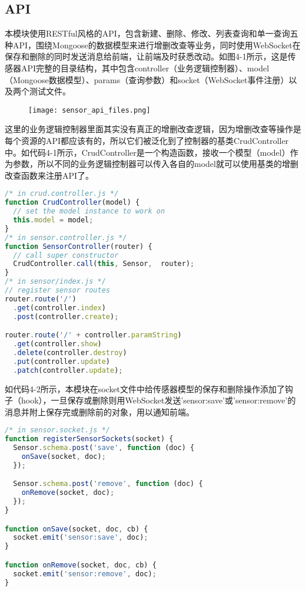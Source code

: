 \subsection{API}
本模块使用RESTful风格的API，包含新建、删除、修改、列表查询和单一查询五种API，围绕Mongoose的数据模型来进行增删改查等业务，同时使用WebSocket在保存和删除的同时发送消息给前端，让前端及时获悉改动。如图4-1所示，这是传感器API完整的目录结构，其中包含controller（业务逻辑控制器）、model（Mongoose数据模型）、params（查询参数）和socket（WebSocket事件注册）以及两个测试文件。
\begin{figure}[H]
 \centering
 \texttt{[image: sensor\_api\_files.png]}
\end{figure}
这里的业务逻辑控制器里面其实没有真正的增删改查逻辑，因为增删改查等操作是每个资源的API都应该有的，所以它们被泛化到了控制器的基类CrudController中。如代码4-1所示，CrudController是一个构造函数，接收一个模型（model）作为参数，所以不同的业务逻辑控制器可以传入各自的model就可以使用基类的增删改查函数来注册API了。
\begin{lstlisting}[language={JavaScript}, caption={传感器API定义}]
/* in crud.controller.js */
function CrudController(model) {
  // set the model instance to work on
  this.model = model;
}
/* in sensor.controller.js */
function SensorController(router) {
  // call super constructor
  CrudController.call(this, Sensor,  router);
}
/* in sensor/index.js */
// register sensor routes
router.route('/')
  .get(controller.index)
  .post(controller.create);

router.route('/' + controller.paramString)
  .get(controller.show)
  .delete(controller.destroy)
  .put(controller.update)
  .patch(controller.update);
\end{lstlisting}

如代码4-2所示，本模块在socket文件中给传感器模型的保存和删除操作添加了钩子（hook），一旦保存或删除则用WebSocket发送'sensor:save'或'sensor:remove'的消息并附上保存完或删除前的对象，用以通知前端。
\begin{lstlisting}[language={JavaScript}, caption={Sensor的Mongoose模型}]
/* in sensor.socket.js */
function registerSensorSockets(socket) {
  Sensor.schema.post('save', function (doc) {
    onSave(socket, doc);
  });

  Sensor.schema.post('remove', function (doc) {
    onRemove(socket, doc);
  });
}

function onSave(socket, doc, cb) {
  socket.emit('sensor:save', doc);
}

function onRemove(socket, doc, cb) {
  socket.emit('sensor:remove', doc);
}
\end{lstlisting}

